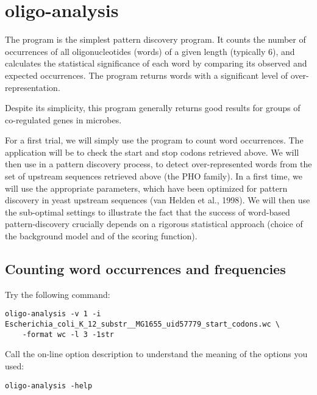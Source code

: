 \section{oligo-analysis}

The program  is the simplest pattern discovery
program. It counts the number of occurrences of all oligonucleotides
(words) of a given length (typically 6), and calculates the
statistical significance of each word by comparing its observed and
expected occurrences. The program returns words with a significant
level of over-representation.

Despite its simplicity, this program generally returns good results
for groups of co-regulated genes in microbes.

For a first trial, we will simply use the program to count word
occurrences. The application will be to check the start and stop
codons retrieved above. We will then use  in a
pattern discovery process, to detect over-represented words from the
set of upstream sequences retrieved above (the PHO family).  In a
first time, we will use the appropriate parameters, which have been
optimized for pattern discovery in yeast upstream sequences (van
Helden et al., 1998). We will then use the sub-optimal settings to
illustrate the fact that the success of word-based pattern-discovery
crucially depends on a rigorous statistical approach (choice of the
background model and of the scoring function).

\subsection{Counting word occurrences and frequencies}

Try the following command:

{\color{Blue} \begin{footnotesize} 
\begin{verbatim}
oligo-analysis -v 1 -i Escherichia_coli_K_12_substr__MG1655_uid57779_start_codons.wc \
    -format wc -l 3 -1str
\end{verbatim} \end{footnotesize}
}

Call the on-line option description to understand the meaning of the
options you used:

{\color{Blue} \begin{footnotesize} 
\begin{verbatim}
oligo-analysis -help
\end{verbatim} \end{footnotesize}
}


